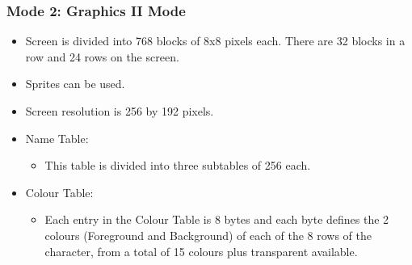         \subsubsection{Mode 2: \textbf{Graphics II Mode}}
        \begin{itemize}
            \item Screen is divided into 768 blocks of 8x8 pixels each. There
            are 32 blocks in a row and 24 rows on the screen.
            \item Sprites can be used.
            \item Screen resolution is 256 by 192 pixels.
            \item Name Table:
            \begin{itemize}
                \item This table is divided into three subtables of 256 each.
            \end{itemize}
            \item Colour Table:
            \begin{itemize}
                \item Each entry in the Colour Table is 8 bytes and each byte
                    defines the 2 colours (Foreground and Background) of each 
                    of the 8 rows of the character, from a total of 15 colours
                    plus transparent available.
            \end{itemize}
        \end{itemize}

